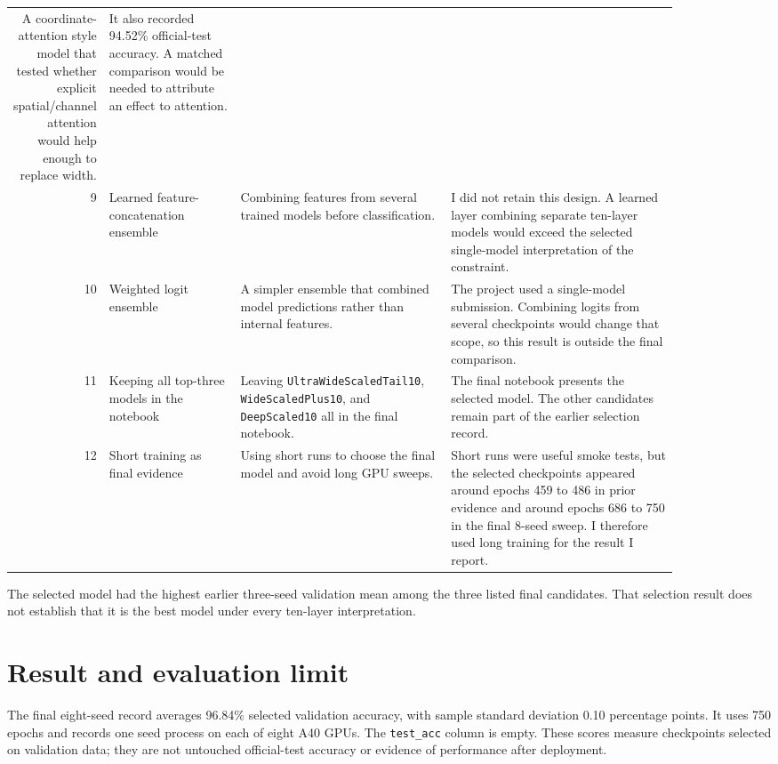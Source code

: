\documentclass[11pt]{article}
\begin{document}
\begin{longtable}{r p{0.20\linewidth} p{0.32\linewidth} p{0.35\linewidth}}
A coordinate-attention style model that tested whether explicit spatial/channel
attention would help enough to replace width. &
It also recorded 94.52\% official-test accuracy. A matched comparison would be needed to attribute an effect to attention. \\
9 & Learned feature-concatenation ensemble &
Combining features from several trained models before classification. &
I did not retain this design. A learned layer combining separate ten-layer models would exceed the selected single-model interpretation of the constraint. \\
10 & Weighted logit ensemble &
A simpler ensemble that combined model predictions rather than internal features. &
The project used a single-model submission. Combining logits from several checkpoints would change that scope, so this result is outside the final comparison. \\
11 & Keeping all top-three models in the notebook &
Leaving \texttt{UltraWideScaledTail10}, \texttt{WideScaledPlus10}, and
\texttt{DeepScaled10} all in the final notebook. &
The final notebook presents the selected model. The other candidates remain part of the earlier selection record. \\
12 & Short training as final evidence &
Using short runs to choose the final model and avoid long GPU sweeps. &
Short runs were useful smoke tests, but the selected checkpoints appeared around epochs
459 to 486 in prior evidence and around epochs 686 to 750 in the final 8-seed sweep. I
therefore used long training for the result I report. \\
\bottomrule
\end{longtable}
\endgroup

The selected model had the highest earlier three-seed validation mean among the three listed final candidates. That selection result does not establish that it is the best model under every ten-layer interpretation.

\section{Result and evaluation limit}

The final eight-seed record averages 96.84\% selected validation accuracy, with sample standard deviation 0.10 percentage points. It uses 750 epochs and records one seed process on each of eight A40 GPUs. The \texttt{test\_acc} column is empty. These scores measure checkpoints selected on validation data; they are not untouched official-test accuracy or evidence of performance after deployment.
\end{document}
